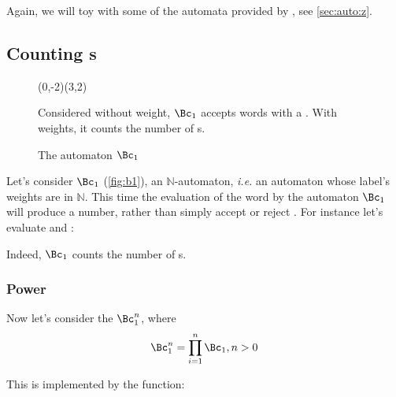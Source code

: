 Again, we will toy with some of the automata provided by
, see \autoref{sec:auto:z}.

\subsection{Counting s}

\begin{figure}[tp] \centering
  \begin{VCPicture}{(0,-2)(3,2)}
     
  \end{VCPicture}
  \begin{legend}
    Considered without weight, $\Bc_1$ accepts words with a .
    With weights, it counts the number of s.
  \end{legend}
  \caption{The automaton $\Bc_1$}
  \label{fig:b1}
\end{figure}

Let's consider $\Bc_1$ (\autoref{fig:b1}), an
$\mathbb{N}$-automaton,
\textit{i.e.}  an automaton whose label's weights are in $\mathbb{N}$.
This time the evaluation of the word  by the automaton
$\Bc_1$ will produce a number, rather than simply accept or
reject .  For instance let's evaluate  and
:


\noindent
Indeed, $\Bc_1$ counts the number of s.

\subsubsection{Power}

Now let's consider the $\Bc_1^n$, where
\begin{displaymath}
  \Bc_1^n = \prod_{i=1}^n \Bc_1, n > 0
\end{displaymath}

\noindent
This is implemented by the  function:

